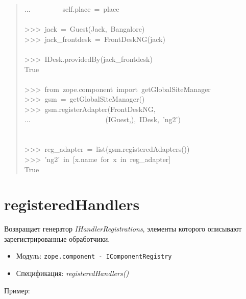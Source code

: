 \documentclass[14pt,a4paper,openany,twoside,final]{extbook}
\providecommand*{\DUroletitlereference}[1]{\textsl{#1}}
\begin{document}
\begin{quote}
{...~~~~~~~~~self.place~=~place\\
~\\
>{}>{}>~jack~=~Guest(\textquotedbl{}Jack\textquotedbl{},~\textquotedbl{}Bangalore\textquotedbl{})\\
>{}>{}>~jack\_frontdesk~=~FrontDeskNG(jack)\\
~\\
>{}>{}>~IDesk.providedBy(jack\_frontdesk)\\
True\\
~\\
>{}>{}>~from~zope.component~import~getGlobalSiteManager\\
>{}>{}>~gsm~=~getGlobalSiteManager()\\
>{}>{}>~gsm.registerAdapter(FrontDeskNG,\\
...~~~~~~~~~~~~~~~~~~~~~(IGuest,),~IDesk,~'ng2')\\
~\\
~\\
>{}>{}>~reg\_adapter~=~list(gsm.registeredAdapters())\\
>{}>{}>~'ng2'~in~{[}x.name~for~x~in~reg\_adapter{]}\\
True
}
\end{quote}


\section*{registeredHandlers%
  \label{registeredhandlers}%
}

Возвращает генератор \DUroletitlereference{IHandlerRegistrations}, элементы которого
описывают зарегистрированные обработчики.

\begin{itemize}

\item Модуль: \texttt{zope.component - IComponentRegistry}

\item Спецификация: \DUroletitlereference{registeredHandlers()}

\end{itemize}

Пример:
\end{document}
